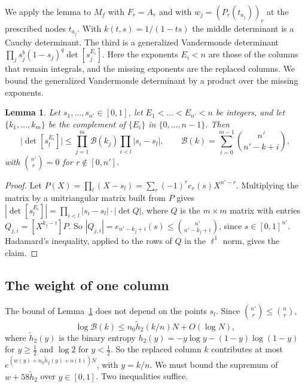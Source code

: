 \documentclass[11pt]{amsart}
\newtheorem{lemma}[theorem]{Lemma}
\theoremstyle{definition}
\theoremstyle{remark}
\numberwithin{equation}{section}
\begin{document}
We apply the lemma to $M_f$ with $F_r=A_r$ and with $w_j=(P_r(t_{a_j}))_r$ at the prescribed nodes $t_{a_j}$.
With $k(t,s)=1/(1-ts)$ the middle determinant is a Cauchy determinant. The third is a generalized
Vandermonde determinant $\prod_js_j^b(1-s_j)^q\det[s_j^{E_i}]$. Here the exponents $E_i<n$ are those of the
columns that remain integrals, and the missing exponents are the replaced columns. We bound the generalized
Vandermonde determinant by a product over the missing exponents.

\begin{lemma}\label{lem:binomvand}
Let $s_1,\ldots,s_{n'}\in[0,1]$, let $E_1<\dots<E_{n'}<n$ be integers, and let $\{k_1,\ldots,k_m\}$ be the
complement of $\{E_i\}$ in $\{0,\ldots,n-1\}$. Then
\[
 \bigl|\det[s_l^{E_i}]\bigr|\le\prod_{j=1}^m\mathcal B(k_j)\prod_{i<l}|s_i-s_l|,\qquad
 \mathcal B(k)=\sum_{i=0}^{m-1}\binom{n'}{n'-k+i},
\]
with $\binom{n'}r=0$ for $r\notin[0,n']$.
\end{lemma}

\begin{proof}
Let $P(X)=\prod_l(X-s_l)=\sum_r(-1)^re_r(s)X^{n'-r}$. Multiplying the matrix by a unitriangular matrix built
from $P$ gives $|\det[s_l^{E_i}]|=\prod_{i<l}|s_i-s_l|\cdot|\det Q|$, where $Q$ is the $m\times m$ matrix with
entries $Q_{j,i}=[X^{k_j-i}]P$. So $|Q_{j,i}|=e_{n'-k_j+i}(s)\le\binom{n'}{n'-k_j+i}$, since $s\in[0,1]^{n'}$.
Hadamard's inequality, applied to the rows of $Q$ in the $\ell^1$ norm, gives the claim.
\end{proof}

\subsection{The weight of one column}\label{ssec:weights}
The bound of Lemma~\ref{lem:binomvand} does not depend on the points $s_l$. Since $\binom{n'}r\le\binom nr$,
\[
 \log\mathcal B(k)\le n_0\tilde h_2(k/n)N+O(\log N),
\]
where $\tilde h_2(y)$ is the binary entropy $h_2(y)=-y\log y-(1-y)\log(1-y)$ for $y\ge\frac12$ and $\log2$ for
$y<\frac12$. So the replaced column $k$ contributes at most $e^{(w(y)+n_0\tilde h_2(y)+o(1))N}$, with $y=k/n$.
We must bound the supremum of $w+58\tilde h_2$ over $y\in[0,1]$. Two inequalities suffice.
\end{document}
